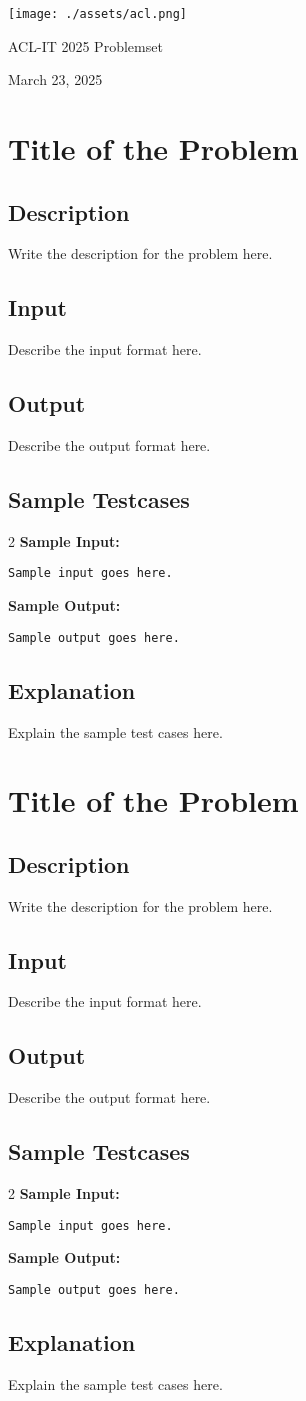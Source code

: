 \documentclass[12pt]{article}
\makeatletter
\newenvironment{problem}
{%
  \newcommand{\problemtitle}[1]{\def\@problemtitle{##1}}
  \newcommand{\problemdesc}[1]{\def\@problemdesc{##1}}
  \newcommand{\probleminput}[1]{\def\@probleminput{##1}}
  \newcommand{\problemoutput}[1]{\def\@problemoutput{##1}}
  \newcommand{\problemsamplein}[1]{\def\@problemsamplein{##1}}
  \newcommand{\problemsampleout}[1]{\def\@problemsampleout{##1}}
  \newcommand{\problemexplain}[1]{\def\@problemexplain{##1}}
  \def\@problemtitle{}
  \def\@problemdesc{}
  \def\@probleminput{}
  \def\@problemoutput{}
  \def\@problemsamplein{}
  \def\@problemsampleout{}
  \def\@problemexplain{}
}
{%
  \setlength\parindent{0pt}
  
  \section*{\@problemtitle}

  \subsection*{Description}
  \@problemdesc

  \subsection*{Input}
  \@probleminput

  \subsection*{Output}
  \@problemoutput

  \subsection*{Sample Testcases}
  \begin{multicols}{2}
    \textbf{Sample Input:}

    \texttt{\@problemsamplein}
    
    \columnbreak
    
    \textbf{Sample Output:}

    \texttt{\@problemsampleout}
  \end{multicols}

  \subsection*{Explanation}
  \@problemexplain
  
  \clearpage
}
\makeatother
\begin{document}
\begin{titlepage}
  \setlength\parskip{0.2cm}
  \centering
  
  \texttt{[image: ./assets/acl.png]}
  
  {\Huge ACL-IT 2025 Problemset}
  
  {\Large March 23, 2025}
  
\end{titlepage}

\begin{problem}
  \problemtitle{Title of the Problem}
  \problemdesc{Write the description for the problem here.}
  \probleminput{Describe the input format here.}
  \problemoutput{Describe the output format here.}
  \problemsamplein{Sample input goes here.}
  \problemsampleout{Sample output goes here.}
  \problemexplain{Explain the sample test cases here.}
\end{problem}

\begin{problem}
  \problemtitle{Title of the Problem}
  \problemdesc{Write the description for the problem here.}
  \probleminput{Describe the input format here.}
  \problemoutput{Describe the output format here.}
  \problemsamplein{Sample input goes here.}
  \problemsampleout{Sample output goes here.}
  \problemexplain{Explain the sample test cases here.}
\end{problem}
\end{document}
